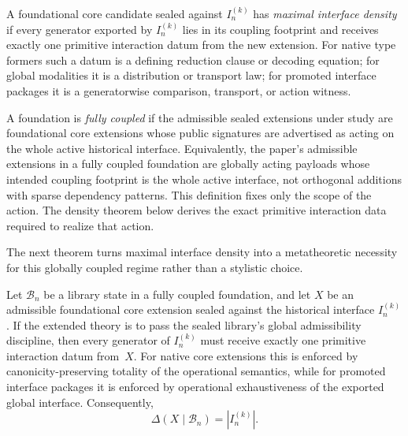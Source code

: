 \documentclass{lmcs}
\newcommand{\B}{\mathcal{B}}
\begin{document}
\begin{defi}
\label{def:max-density}
A foundational core candidate sealed against $I_n^{(k)}$ has \emph{maximal interface density} if every generator exported by $I_n^{(k)}$ lies in its coupling footprint and receives exactly one primitive interaction datum from the new extension. For native type formers such a datum is a defining reduction clause or decoding equation; for global modalities it is a distribution or transport law; for promoted interface packages it is a generatorwise comparison, transport, or action witness.
\end{defi}

\begin{defi}
\label{def:fully-coupled}
A foundation is \emph{fully coupled} if the admissible sealed extensions under study are foundational core extensions whose public signatures are advertised as acting on the whole active historical interface. Equivalently, the paper's admissible extensions in a fully coupled foundation are globally acting payloads whose intended coupling footprint is the whole active interface, not orthogonal additions with sparse dependency patterns. This definition fixes only the scope of the action. The density theorem below derives the exact primitive interaction data required to realize that action.
\end{defi}

The next theorem turns maximal interface density into a metatheoretic necessity for this globally coupled regime rather than a stylistic choice.

\begin{thm}
\label{thm:canonicity}
Let $\B_n$ be a library state in a fully coupled foundation, and let $X$ be an admissible foundational core extension sealed against the historical interface $I_n^{(k)}$. If the extended theory is to pass the sealed library's global admissibility discipline, then every generator of $I_n^{(k)}$ must receive exactly one primitive interaction datum from~$X$. For native core extensions this is enforced by canonicity-preserving totality of the operational semantics, while for promoted interface packages it is enforced by operational exhaustiveness of the exported global interface. Consequently,
\[
  \Delta(X \mid \B_n) = |I_n^{(k)}|.
\]
\end{thm}
\end{document}
